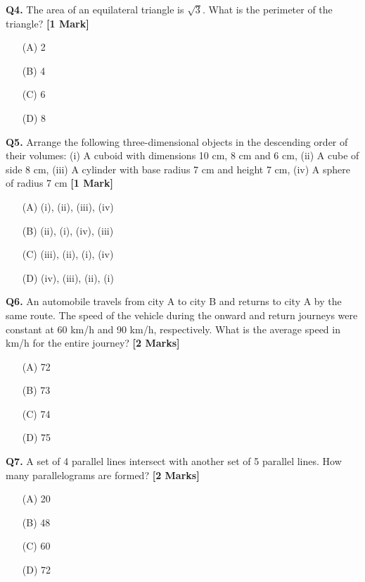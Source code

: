 \documentclass[11pt]{article}
\newcommand{\questiona}[2]{
    \noindent\textbf{Q#2.} #1 \hfill \textbf{[1 Mark]}
}
\newcommand{\questionb}[2]{
    \noindent\textbf{Q#2.} #1 \hfill \textbf{[2 Marks]}
}
\begin{document}
\questiona{The area of an equilateral triangle is \(\sqrt{3}\). What is the perimeter of the triangle?}{4}
\begin{enumerate}
    \item[(A)] 2
    \item[(B)] 4
    \item[(C)] 6
    \item[(D)] 8
\end{enumerate}
\vspace{0.5cm}

\questiona{Arrange the following three-dimensional objects in the descending order of their volumes: (i) A cuboid with dimensions 10 cm, 8 cm and 6 cm, (ii) A cube of side 8 cm, (iii) A cylinder with base radius 7 cm and height 7 cm, (iv) A sphere of radius 7 cm}{5}
\begin{enumerate}
    \item[(A)] (i), (ii), (iii), (iv)
    \item[(B)] (ii), (i), (iv), (iii)
    \item[(C)] (iii), (ii), (i), (iv)
    \item[(D)] (iv), (iii), (ii), (i)
\end{enumerate}
\vspace{0.5cm}

\questionb{An automobile travels from city A to city B and returns to city A by the same route. The speed of the vehicle during the onward and return journeys were constant at 60 km/h and 90 km/h, respectively. What is the average speed in km/h for the entire journey?}{6}
\begin{enumerate}
    \item[(A)] 72
    \item[(B)] 73
    \item[(C)] 74
    \item[(D)] 75
\end{enumerate}
\vspace{0.5cm}

\questionb{A set of 4 parallel lines intersect with another set of 5 parallel lines. How many parallelograms are formed?}{7}
\begin{enumerate}
    \item[(A)] 20
    \item[(B)] 48
    \item[(C)] 60
    \item[(D)] 72
\end{enumerate}
\vspace{0.5cm}
\end{document}
